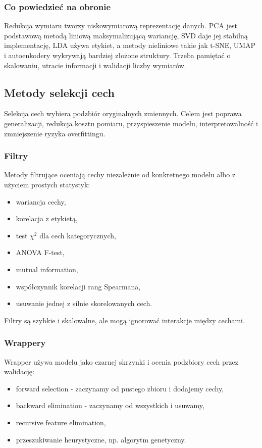 \subsubsection{Co powiedzieć na obronie}

Redukcja wymiaru tworzy niskowymiarową reprezentację danych. PCA jest podstawową metodą liniową maksymalizującą wariancję, SVD daje jej stabilną implementację, LDA używa etykiet, a metody nieliniowe takie jak t-SNE, UMAP i autoenkodery wykrywają bardziej złożone struktury. Trzeba pamiętać o skalowaniu, utracie informacji i walidacji liczby wymiarów.

\subsection{Metody selekcji cech}

Selekcja cech wybiera podzbiór oryginalnych zmiennych. Celem jest poprawa generalizacji, redukcja kosztu pomiaru, przyspieszenie modelu, interpretowalność i zmniejszenie ryzyka overfittingu.

\subsubsection{Filtry}

Metody filtrujące oceniają cechy niezależnie od konkretnego modelu albo z użyciem prostych statystyk:
\begin{itemize}
  \item wariancja cechy,
  \item korelacja z etykietą,
  \item test $\chi^2$ dla cech kategorycznych,
  \item ANOVA F-test,
  \item mutual information,
  \item współczynnik korelacji rang Spearmana,
  \item usuwanie jednej z silnie skorelowanych cech.
\end{itemize}

Filtry są szybkie i skalowalne, ale mogą ignorować interakcje między cechami.

\subsubsection{Wrappery}

Wrapper używa modelu jako czarnej skrzynki i ocenia podzbiory cech przez walidację:
\begin{itemize}
  \item forward selection - zaczynamy od pustego zbioru i dodajemy cechy,
  \item backward elimination - zaczynamy od wszystkich i usuwamy,
  \item recursive feature elimination,
  \item przeszukiwanie heurystyczne, np. algorytm genetyczny.
\end{itemize}

